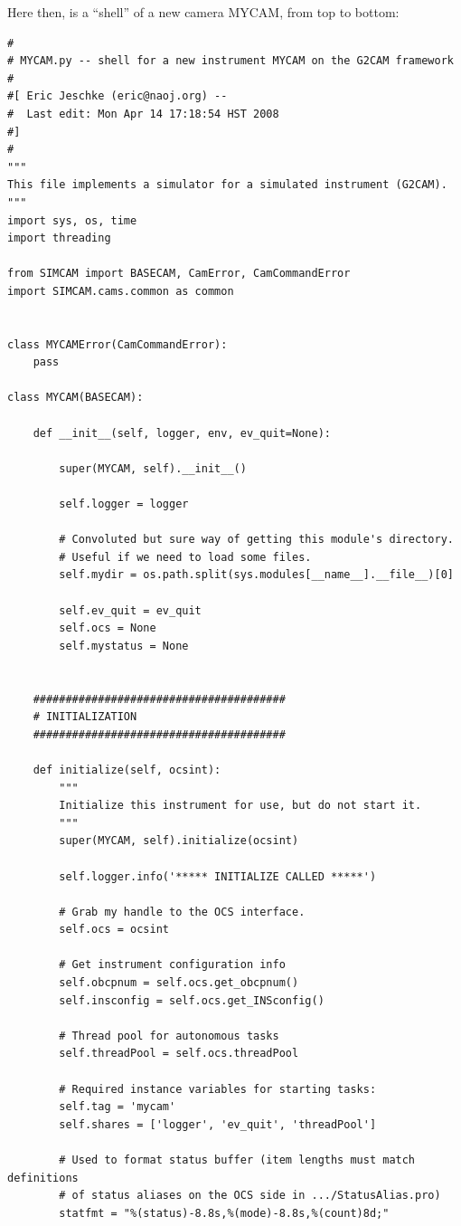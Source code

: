 \documentclass[11pt]{report}
\begin{document}
Here then, is a ``shell'' of a new camera MYCAM, from top to bottom:
\begin{verbatim}
#
# MYCAM.py -- shell for a new instrument MYCAM on the G2CAM framework
#
#[ Eric Jeschke (eric@naoj.org) --
#  Last edit: Mon Apr 14 17:18:54 HST 2008
#]
#
"""
This file implements a simulator for a simulated instrument (G2CAM).
"""
import sys, os, time
import threading

from SIMCAM import BASECAM, CamError, CamCommandError
import SIMCAM.cams.common as common


class MYCAMError(CamCommandError):
    pass

class MYCAM(BASECAM):

    def __init__(self, logger, env, ev_quit=None):

        super(MYCAM, self).__init__()
        
        self.logger = logger

        # Convoluted but sure way of getting this module's directory.
        # Useful if we need to load some files.
        self.mydir = os.path.split(sys.modules[__name__].__file__)[0]

        self.ev_quit = ev_quit
        self.ocs = None
        self.mystatus = None


    #######################################
    # INITIALIZATION
    #######################################

    def initialize(self, ocsint):
        """
        Initialize this instrument for use, but do not start it.  
        """
        super(MYCAM, self).initialize(ocsint)

        self.logger.info('***** INITIALIZE CALLED *****')

        # Grab my handle to the OCS interface.
        self.ocs = ocsint

        # Get instrument configuration info
        self.obcpnum = self.ocs.get_obcpnum()
        self.insconfig = self.ocs.get_INSconfig()

        # Thread pool for autonomous tasks
        self.threadPool = self.ocs.threadPool

        # Required instance variables for starting tasks:
        self.tag = 'mycam'
        self.shares = ['logger', 'ev_quit', 'threadPool']
        
        # Used to format status buffer (item lengths must match definitions
        # of status aliases on the OCS side in .../StatusAlias.pro)
        statfmt = "%(status)-8.8s,%(mode)-8.8s,%(count)8d;"


\end{verbatim}
\end{document}
